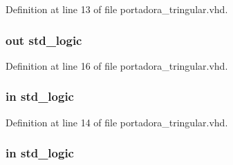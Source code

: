 Definition at line 13 of file portadora\+\_\+tringular.\+vhd.

\hypertarget{classportadora__tringular_a8fb21bca6cb529fd30fa4b1f8b156237}{}
\subsubsection[{dir}]{ {\bfseries \textcolor{keywordflow}{out}\textcolor{vhdlchar}{ }} {\bfseries \textcolor{comment}{std\+\_\+logic}\textcolor{vhdlchar}{ }} \hspace{0.3cm}{\ttfamily [Port]}}\label{classportadora__tringular_a8fb21bca6cb529fd30fa4b1f8b156237}


Definition at line 16 of file portadora\+\_\+tringular.\+vhd.

\hypertarget{classportadora__tringular_ac855daed6a8d1b25a13c5d5b4aa46c3e}{}
\subsubsection[{dir\+\_\+ini}]{ {\bfseries \textcolor{keywordflow}{in}\textcolor{vhdlchar}{ }} {\bfseries \textcolor{comment}{std\+\_\+logic}\textcolor{vhdlchar}{ }} \hspace{0.3cm}{\ttfamily [Port]}}\label{classportadora__tringular_ac855daed6a8d1b25a13c5d5b4aa46c3e}


Definition at line 14 of file portadora\+\_\+tringular.\+vhd.

\hypertarget{classportadora__tringular_adcf9c6f5161d039addbda5819bee64a3}{}
\subsubsection[{en}]{ {\bfseries \textcolor{keywordflow}{in}\textcolor{vhdlchar}{ }} {\bfseries \textcolor{comment}{std\+\_\+logic}\textcolor{vhdlchar}{ }} \hspace{0.3cm}{\ttfamily [Port]}}\label{classportadora__tringular_adcf9c6f5161d039addbda5819bee64a3}


